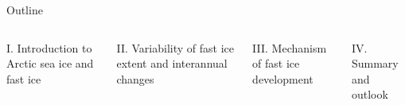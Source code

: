 \documentclass[8pt]{beamer}
\begin{document}
\setwatermark{\fontsize{125pt}{125pt}\selectfont{}}
\begin{frame}{Outline}
	\begin{columns}
		\begin{block}{I. Introduction to Arctic sea ice and fast ice}
		\end{block}
		\begin{block}{II. Variability of fast ice extent and interannual changes}
		\end{block}
		\begin{block}{III. Mechanism of fast ice development}
		\end{block}
		\begin{block}{IV. Summary and outlook} 
		\end{block}
	\end{columns}
\end{frame}
\end{document}
